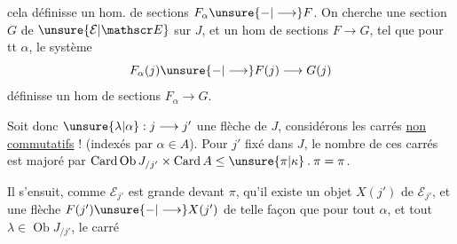 cela définisse un hom. de sections $F_{\alpha}\unsure{\mathbin{-}|\longrightarrow}F$. On cherche une section $G$ de $\unsure{\mathcal E|\mathscr E}$ sur $J$, et un hom de sections $F\longrightarrow G$, tel que pour tt $\alpha$, le système  
\[
 F_{\alpha}(j)\unsure{\mathbin{-}|\longrightarrow} F(j)\longrightarrow G(j)
\]
 définisse un hom de sections $F_{\alpha}\longrightarrow G$.

Soit donc $\unsure{\lambda|\alpha}:j\longrightarrow j'$ une flèche de $J$, considérons les carrés \unsure{(}\uline{non commutatifs} !\unsure{,}
(indexés par $\alpha\in A$). Pour $j'$ fixé dans $J$, le nombre de ces carrés est majoré par $\operatorname{Card}\operatorname{Ob}J_{/j'}\times\operatorname{Card}A\leq\unsure{\pi|\kappa}\mathbin{.}\pi=\pi$.

Il s'ensuit, comme $\mathcal E_{j'}$ est grande devant $\pi$, qu'il existe un objet $X(j')$ de $\mathcal E_{j'}$, et une flèche  $F(j')\unsure{\mathbin{-}|\longrightarrow} X(j')$ de telle façon que pour tout $\alpha$, et tout $\lambda\in\operatorname{Ob}J_{/j'}$, le carré  
